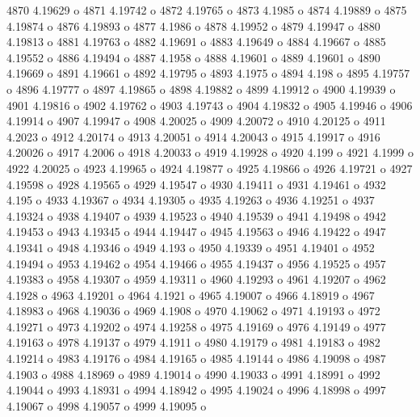  4870  4.19629  o
 4871  4.19742  o
 4872  4.19765  o
 4873  4.1985  o
 4874  4.19889  o
 4875  4.19874  o
 4876  4.19893  o
 4877  4.1986  o
 4878  4.19952  o
 4879  4.19947  o
 4880  4.19813  o
 4881  4.19763  o
 4882  4.19691  o
 4883  4.19649  o
 4884  4.19667  o
 4885  4.19552  o
 4886  4.19494  o
 4887  4.1958  o
 4888  4.19601  o
 4889  4.19601  o
 4890  4.19669  o
 4891  4.19661  o
 4892  4.19795  o
 4893  4.1975  o
 4894  4.198  o
 4895  4.19757  o
 4896  4.19777  o
 4897  4.19865  o
 4898  4.19882  o
 4899  4.19912  o
 4900  4.19939  o
 4901  4.19816  o
 4902  4.19762  o
 4903  4.19743  o
 4904  4.19832  o
 4905  4.19946  o
 4906  4.19914  o
 4907  4.19947  o
 4908  4.20025  o
 4909  4.20072  o
 4910  4.20125  o
 4911  4.2023  o
 4912  4.20174  o
 4913  4.20051  o
 4914  4.20043  o
 4915  4.19917  o
 4916  4.20026  o
 4917  4.2006  o
 4918  4.20033  o
 4919  4.19928  o
 4920  4.199  o
 4921  4.1999  o
 4922  4.20025  o
 4923  4.19965  o
 4924  4.19877  o
 4925  4.19866  o
 4926  4.19721  o
 4927  4.19598  o
 4928  4.19565  o
 4929  4.19547  o
 4930  4.19411  o
 4931  4.19461  o
 4932  4.195  o
 4933  4.19367  o
 4934  4.19305  o
 4935  4.19263  o
 4936  4.19251  o
 4937  4.19324  o
 4938  4.19407  o
 4939  4.19523  o
 4940  4.19539  o
 4941  4.19498  o
 4942  4.19453  o
 4943  4.19345  o
 4944  4.19447  o
 4945  4.19563  o
 4946  4.19422  o
 4947  4.19341  o
 4948  4.19346  o
 4949  4.193  o
 4950  4.19339  o
 4951  4.19401  o
 4952  4.19494  o
 4953  4.19462  o
 4954  4.19466  o
 4955  4.19437  o
 4956  4.19525  o
 4957  4.19383  o
 4958  4.19307  o
 4959  4.19311  o
 4960  4.19293  o
 4961  4.19207  o
 4962  4.1928  o
 4963  4.19201  o
 4964  4.1921  o
 4965  4.19007  o
 4966  4.18919  o
 4967  4.18983  o
 4968  4.19036  o
 4969  4.1908  o
 4970  4.19062  o
 4971  4.19193  o
 4972  4.19271  o
 4973  4.19202  o
 4974  4.19258  o
 4975  4.19169  o
 4976  4.19149  o
 4977  4.19163  o
 4978  4.19137  o
 4979  4.1911  o
 4980  4.19179  o
 4981  4.19183  o
 4982  4.19214  o
 4983  4.19176  o
 4984  4.19165  o
 4985  4.19144  o
 4986  4.19098  o
 4987  4.1903  o
 4988  4.18969  o
 4989  4.19014  o
 4990  4.19033  o
 4991  4.18991  o
 4992  4.19044  o
 4993  4.18931  o
 4994  4.18942  o
 4995  4.19024  o
 4996  4.18998  o
 4997  4.19067  o
 4998  4.19057  o
 4999  4.19095  o

